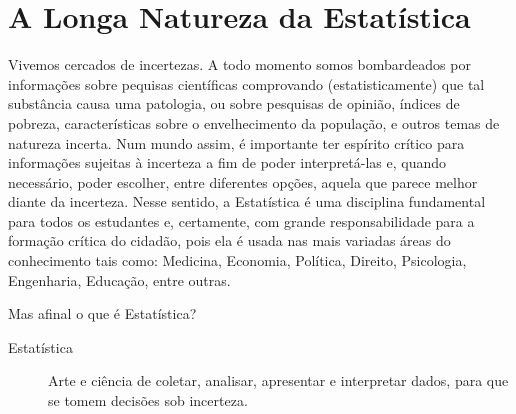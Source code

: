 
\def\chapterillustration{./abertura-estatistica1}%
\def\chapterwhat{Especificidade do pensamento estatístico a partir de problemas. Conceitos: população e amostra, parâmetro e estimador. Variáveis estatísticas e suas classificações. Organização dos dados em tabelas de frequências. Representações gráficas adequadas para os diferentes tipos de variáveis. Noções básicas de amostragem.}
\def\chapterbecause{A Estatística está presente no mundo contemporâneo e chega aos cidadãos em todos os
meios de comunicação. Diariamente somos confrontados com informações estatísticas
sobre temas como Economia, Educação, Esportes, Saúde, Meio-Ambiente, entre outros.
Tais informações orientam decisões em nossas vidas pessoais e permitem-nos exercer
nossas responsabilidades como cidadãos. Um conhecimento básico de Estatística é
fundamental na formação do cidadão para que este possa, de forma competente, apreciar
e criticar argumentos baseados em dados.} 
\chapter{A Longa Natureza da Estatística}
\label{\detokenize{PE103:a-natureza-da-estatistica}}\label{\detokenize{PE103::doc}}


\label{\detokenize{PE103-0:explorando-compreendendo-a-natureza-da-estatistica}}\label{\detokenize{PE103-0::doc}}\label{\detokenize{PE103-0:cap-a-natureza-da-estatistica}}
Vivemos cercados de incertezas. A todo momento somos bombardeados por informações sobre pequisas científicas comprovando (estatisticamente) que tal substância causa uma patologia, ou sobre pesquisas de opinião, índices de pobreza, características sobre o envelhecimento da população, e outros temas de natureza incerta. Num mundo assim, é importante ter espírito crítico para informações sujeitas à incerteza a fim de poder interpretá-las e, quando necessário, poder escolher, entre diferentes opções, aquela que parece melhor diante da incerteza.  Nesse sentido, a Estatística é uma disciplina fundamental para todos os estudantes e, certamente, com grande responsabilidade para a formação crítica do cidadão, pois ela é usada nas mais variadas áreas do conhecimento tais como: Medicina, Economia, Política, Direito, Psicologia, Engenharia, Educação, entre outras.

Mas afinal o que é Estatística?
\begin{description}
\item[{Estatística}] \leavevmode{}\label{\detokenize{PE103-0:term-estatistica}}
Arte e ciência de coletar, analisar, apresentar e interpretar dados, para que se tomem decisões sob incerteza.
\end{description}

